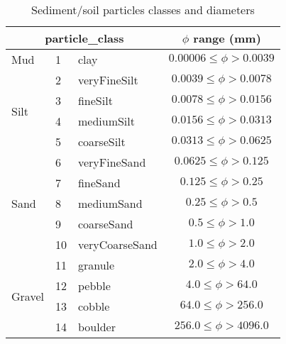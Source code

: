 \documentclass{beamer}
\begin{document}
\begin{frame}
\begin{table}[ht]
\centering
\caption{Sediment/soil particles classes and diameters \cite{Wentworth1922}}
\label{sedClass}
\begin{tabular}{lllc}
\hline
\multicolumn{3}{c}{\alert{particle\_class}}  & $\phi$ range (mm) \\
\hline
Mud & 1 & clay     		& $0.00006 \leq \phi > 0.0039$     \\ \hline
\multirow{4}{*}{Silt} & 2 & veryFineSilt     & $0.0039 \leq \phi > 0.0078$     \\
& 3 & fineSilt			& $0.0078 \leq \phi > 0.0156$     \\
& 4 & mediumSilt		& $0.0156 \leq \phi > 0.0313$     \\
& 5 & coarseSilt		& $0.0313 \leq \phi > 0.0625$     \\ \hline
\multirow{5}{*}{Sand} & 6 & veryFineSand		& $0.0625 \leq \phi > 0.125$     \\
& 7 & fineSand			& $0.125 \leq \phi > 0.25$     \\
& 8 & mediumSand		& $0.25 \leq \phi > 0.5$     \\
& 9 & coarseSand		& $0.5 \leq \phi > 1.0$     \\
& 10 & veryCoarseSand	& $1.0 \leq \phi > 2.0$     \\ \hline
\multirow{4}{*}{Gravel} & 11 &  granule			& $2.0 \leq \phi > 4.0$     \\
& 12 & pebble			& $4.0 \leq \phi > 64.0$     \\
& 13 & cobble			& $64.0 \leq \phi > 256.0$     \\
& 14 & boulder			& $256.0 \leq \phi > 4096.0$  \\
\hline
\end{tabular}
\end{table}

\end{frame}


\begin{frame}
\end{frame}
\end{document}
